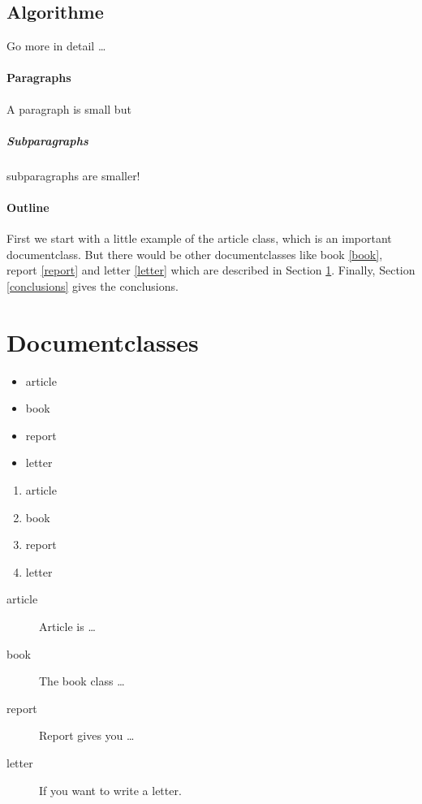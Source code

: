 \documentclass[11pt, a4paper, twoside, titlepage]{article}
\begin{document}
\subsection{Algorithme}
Go more in detail \ldots







\newpage

\paragraph{Paragraphs}
A paragraph is small but 

\subparagraph{Subparagraphs}
subparagraphs are smaller! 

\paragraph{Outline}
First we start with a little example of the article class, which is an 
important documentclass. But there would be other documentclasses like 
book \ref{book}, report \ref{report} and letter \ref{letter} which are 
described in Section \ref{documentclasses}. Finally, Section 
\ref{conclusions} gives the conclusions.



\section{Documentclasses} \label{documentclasses}

\begin{itemize}
\item article
\item book 
\item report 
\item letter 
\end{itemize}


\begin{enumerate}
\item article
\item book 
\item report 
\item letter 
\end{enumerate}

\begin{description}
\item[article\label{article}]{Article is \ldots}
\item[book\label{book}]{The book class \ldots}
\item[report\label{report}]{Report gives you \ldots}
\item[letter\label{letter}]{If you want to write a letter.}
\end{description}
\end{document}
